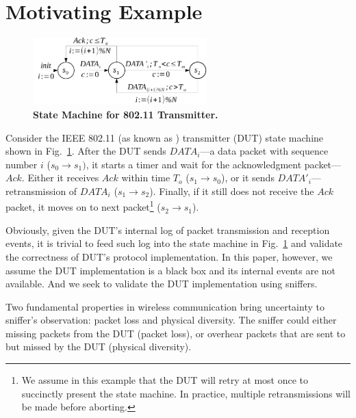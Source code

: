 \section{Motivating Example}
\label{sec:model}

\begin{figure}[h!]
  \vspace*{\beforecaptionskip}
  \centering
  \includegraphics[width=0.6\textwidth]{./figures/dot11_tx_ta.pdf}
  \caption{\textbf{State Machine for 802.11 Transmitter.}}
  \label{fig:dot11_tx_ta}
  \vspace*{\aftercaptionskip}
\end{figure}

Consider the IEEE 802.11 (as known as \wifi{}) transmitter (DUT) state machine
shown in Fig.~\ref{fig:dot11_tx_ta}. After the DUT sends $DATA_i$---a data
packet with sequence number $i$ ($s_0\rightarrow s_1)$, it starts a timer and
wait for the acknowledgment packet---$Ack$. Either it receives $Ack$ within time
$T_o$ ($s_1\rightarrow s_0$), or it sends $DATA'_i$---retransmission of $DATA_i$
($s_1\rightarrow s_2$). Finally, if it still does not receive the $Ack$ packet,
it moves on to next packet\footnote{We assume in this example that the DUT
will retry at most once to succinctly present the state machine.  In practice,
multiple retransmissions will be made before aborting.} ($s_2\rightarrow s_1$).

Obviously, given the DUT's internal log of packet transmission and reception
events, it is trivial to feed such log into the state machine in
Fig.~\ref{fig:dot11_tx_ta} and validate the correctness of DUT's protocol
implementation. In this paper, however, we assume the DUT implementation is a
black box and its internal events are not available. And we seek to validate the
DUT implementation using sniffers.

Two fundamental properties in wireless communication bring uncertainty
to sniffer's observation: packet loss and physical diversity. The sniffer could
either missing packets from the DUT (packet loss), or overhear packets that are
sent to but missed by the DUT (physical diversity).

